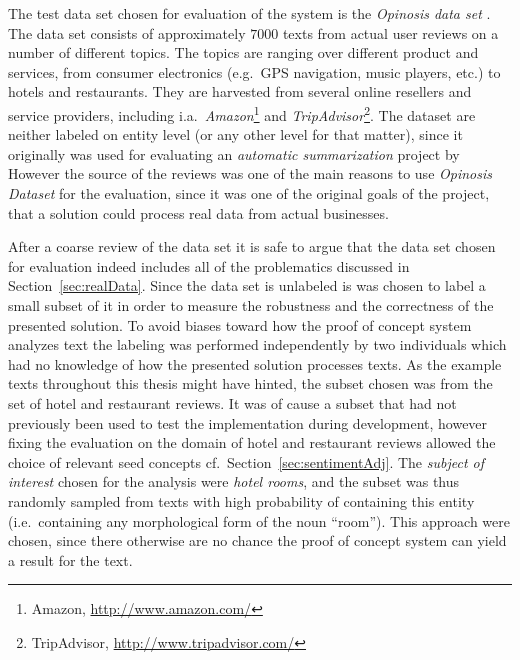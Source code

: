 The test data set chosen for evaluation of the system is the \emph{Opinosis data set} \cite{Opinosis}. The data set consists of  approximately $\num{7000}$ texts from actual user reviews on a number of different topics. The topics are ranging over different product and services, from consumer electronics (e.g.\ GPS navigation, music players, etc.) to hotels and restaurants. They are harvested from several online resellers and service providers, including i.a.\ \emph{Amazon}\footnote{Amazon, \url{http://www.amazon.com/}} and \emph{TripAdvisor}\footnote{TripAdvisor, \url{http://www.tripadvisor.com/}}. The dataset are neither labeled on entity level (or any other level for that matter), since it originally was used for evaluating an \emph{automatic summarization} project by \citeauthor{Opinosis} However the source of the reviews was one of the main reasons to use \emph{Opinosis Dataset} for the evaluation, since it was one of the original goals of the project, that a solution could process real data from actual businesses.

After a coarse review of the data set it is safe to argue that the data set chosen for evaluation indeed includes all of the problematics discussed in Section~\vref{sec:realData}. Since the data set is unlabeled is was chosen to label a small subset of it in order to measure the robustness and the correctness of the presented solution. To avoid biases toward how the proof of concept system analyzes text the labeling was performed independently by two individuals which had no knowledge of how the presented solution processes texts. As the example texts throughout this thesis might have hinted, the subset chosen was from the set of hotel and restaurant reviews. It was of cause a subset that had not previously been used to test the implementation during development, however fixing the evaluation on the domain of hotel and restaurant reviews allowed the choice of relevant seed concepts cf.\ Section~\ref{sec:sentimentAdj}. The \emph{subject of interest} chosen for the analysis were \emph{hotel rooms}, and the subset was thus randomly sampled from texts with high probability of containing this entity (i.e.\ containing any morphological form of the noun ``room''). This approach were chosen, since there otherwise are no chance the proof of concept system can yield a result for the text.

